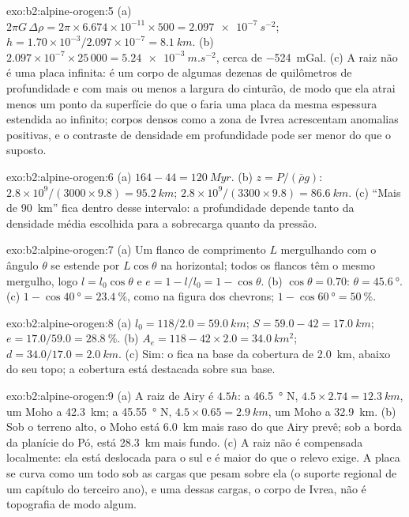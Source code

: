\begin{solution}{exo:b2:alpine-orogen:5}
(a) $2\pi G\,\Delta\rho = 2\pi\times6.674\times10^{-11}\times500 =
\qty{2.097e-7}{s^{-2}}$; $h = 1.70\times10^{-3}/2.097\times10^{-7} = \qty{8.1}{km}$.
(b) $2.097\times10^{-7}\times25\,000 = \qty{5.24e-3}{m.s^{-2}}$, cerca de
\qty{-524}{mGal}. (c) A raiz não é uma placa infinita: é um corpo de algumas dezenas de quilômetros de
profundidade e com mais ou menos a largura do cinturão, de modo que ela atrai menos um ponto da superfície do que o faria uma
placa da mesma espessura estendida ao infinito; corpos densos como a zona de Ivrea
acrescentam anomalias positivas, e o contraste de densidade em profundidade pode ser menor do que o suposto.
\end{solution}

\begin{solution}{exo:b2:alpine-orogen:6}
(a) $164 - 44 = \qty{120}{Myr}$. (b) $z = P/(\bar\rho g)$:
$2.8\times10^9/(3000\times9.8) = \qty{95.2}{km}$; $2.8\times10^9/(3300\times9.8) =
\qty{86.6}{km}$. (c) ``Mais de \qty{90}{km}'' fica dentro desse intervalo: a profundidade depende
tanto da densidade média escolhida para a sobrecarga quanto da pressão.
\end{solution}

\begin{solution}{exo:b2:alpine-orogen:7}
(a) Um flanco de comprimento $L$ mergulhando com o ângulo $\theta$ se estende por $L\cos\theta$ na horizontal; todos os flancos
têm o mesmo mergulho, logo $l = l_0\cos\theta$ e $e = 1 - l/l_0 = 1 - \cos\theta$.
(b) $\cos\theta = 0.70$: $\theta = \qty{45.6}{\degree}$. (c) $1 - \cos\qty{40}{\degree} =
\qty{23.4}{\percent}$, como na figura dos chevrons; $1 - \cos\qty{60}{\degree}
= \qty{50}{\percent}$.
\end{solution}

\begin{solution}{exo:b2:alpine-orogen:8}
(a) $l_0 = 118/2.0 = \qty{59.0}{km}$; $S = 59.0 - 42 = \qty{17.0}{km}$; $e = 17.0/59.0 =
\qty{28.8}{\percent}$. (b) $A_e = 118 - 42\times2.0 = \qty{34.0}{km^2}$; $d = 34.0/17.0 =
\qty{2.0}{km}$. (c) Sim: o  fica na base da cobertura de \qty{2.0}{km}, abaixo
do seu topo; a cobertura está destacada sobre sua base.
\end{solution}

\begin{solution}{exo:b2:alpine-orogen:9}
(a) A raiz de Airy é $4.5h$: a \qty{46.5}{\degree} N, $4.5\times2.74 = \qty{12.3}{km}$, um
Moho a \qty{42.3}{km}; a \qty{45.55}{\degree} N, $4.5\times0.65 = \qty{2.9}{km}$, um Moho
a \qty{32.9}{km}. (b) Sob o terreno alto, o Moho está \qty{6.0}{km} mais raso do que Airy
prevê; sob a borda da planície do Pó, está \qty{28.3}{km} mais fundo. (c) A raiz não é
compensada localmente: ela está deslocada para o sul e é maior do que o relevo exige.
A placa se curva como um todo sob as cargas que pesam sobre ela (o suporte regional de um capítulo do terceiro
ano), e uma dessas cargas, o corpo de Ivrea, não é topografia de modo algum.
\end{solution}

